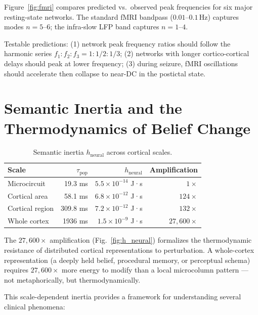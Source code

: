 \documentclass[aps,pre,twocolumn,showpacs,superscriptaddress,longbibliography]{revtex4-2}
\newcommand{\taupop}{\tau_{\mathrm{pop}}}
\newcommand{\hneu}{h_{\mathrm{neural}}}
\begin{document}
Figure~\ref{fig:fmri} compares predicted vs.\ observed peak
frequencies for six major resting-state networks.
The standard fMRI bandpass ($0.01$--$0.1\,\mathrm{Hz}$) captures
modes $n = 5$--$6$; the infra-slow LFP band captures $n = 1$--$4$.

Testable predictions: (1) network peak frequency ratios should
follow the harmonic series $f_1:f_2:f_3 = 1:1/2:1/3$;
(2) networks with longer cortico-cortical delays should peak at
lower frequency; (3) during seizure, fMRI oscillations should
accelerate then collapse to near-DC in the postictal state.

\section{\label{sec:inertia}Semantic Inertia and the
         Thermodynamics of Belief Change}

\begin{table}[h]
\caption{\label{tab:h_scale}Semantic inertia $\hneu$ across
cortical scales.}
\begin{ruledtabular}
\begin{tabular}{lrrr}
Scale & $\taupop$ & $\hneu$ & Amplification \\
\hline
Microcircuit    &  19.3 ms & $5.5\times10^{-14}$ J·s & $1\times$ \\
Cortical area   &  58.1 ms & $6.8\times10^{-12}$ J·s & $124\times$ \\
Cortical region & 309.8 ms & $7.2\times10^{-12}$ J·s & $132\times$ \\
Whole cortex    & 1936  ms & $1.5\times10^{-9}$ J·s  & $27{,}600\times$ \\
\end{tabular}
\end{ruledtabular}
\end{table}

The $27{,}600\times$ amplification (Fig.~\ref{fig:h_neural})
formalizes the thermodynamic resistance of distributed cortical
representations to perturbation. A whole-cortex representation
(a deeply held belief, procedural memory, or perceptual schema)
requires $27{,}600\times$ more energy to modify than a local
microcolumn pattern --- not metaphorically, but thermodynamically.

This scale-dependent inertia provides a framework for
understanding several clinical phenomena:
\end{document}
